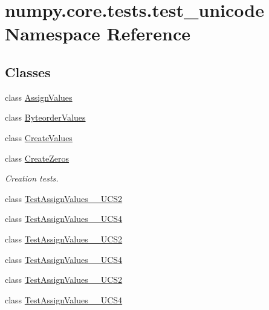 \hypertarget{namespacenumpy_1_1core_1_1tests_1_1test__unicode}{}\section{numpy.\+core.\+tests.\+test\+\_\+unicode Namespace Reference}
\label{namespacenumpy_1_1core_1_1tests_1_1test__unicode}
\subsection*{Classes}
\begin{DoxyCompactItemize}
\item 
class \hyperlink{classnumpy_1_1core_1_1tests_1_1test__unicode_1_1AssignValues}{Assign\+Values}
\item 
class \hyperlink{classnumpy_1_1core_1_1tests_1_1test__unicode_1_1ByteorderValues}{Byteorder\+Values}
\item 
class \hyperlink{classnumpy_1_1core_1_1tests_1_1test__unicode_1_1CreateValues}{Create\+Values}
\item 
class \hyperlink{classnumpy_1_1core_1_1tests_1_1test__unicode_1_1CreateZeros}{Create\+Zeros}
\begin{DoxyCompactList}\small\item\em Creation tests. \end{DoxyCompactList}\item 
class \hyperlink{classnumpy_1_1core_1_1tests_1_1test__unicode_1_1TestAssignValues__1009__UCS2}{Test\+Assign\+Values\+\_\+\_\+\+U\+C\+S2}
\item 
class \hyperlink{classnumpy_1_1core_1_1tests_1_1test__unicode_1_1TestAssignValues__1009__UCS4}{Test\+Assign\+Values\+\_\+\_\+\+U\+C\+S4}
\item 
class \hyperlink{classnumpy_1_1core_1_1tests_1_1test__unicode_1_1TestAssignValues__1__UCS2}{Test\+Assign\+Values\+\_\+\_\+\+U\+C\+S2}
\item 
class \hyperlink{classnumpy_1_1core_1_1tests_1_1test__unicode_1_1TestAssignValues__1__UCS4}{Test\+Assign\+Values\+\_\+\_\+\+U\+C\+S4}
\item 
class \hyperlink{classnumpy_1_1core_1_1tests_1_1test__unicode_1_1TestAssignValues__2__UCS2}{Test\+Assign\+Values\+\_\+\_\+\+U\+C\+S2}
\item 
class \hyperlink{classnumpy_1_1core_1_1tests_1_1test__unicode_1_1TestAssignValues__2__UCS4}{Test\+Assign\+Values\+\_\+\_\+\+U\+C\+S4}
\item 

\end{DoxyCompactItemize}
